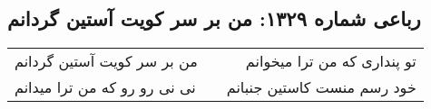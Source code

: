 \begin{center}
\section*{رباعی شماره ۱۳۲۹: من بر سر کویت آستین گردانم}
\label{sec:1329}
\begin{longtable}{l p{0.5cm} r}
من بر سر کویت آستین گردانم
&&
تو پنداری که من ترا میخوانم
\\
نی نی رو رو که من ترا میدانم
&&
خود رسم منست کاستین جنبانم
\\
\end{longtable}
\end{center}
